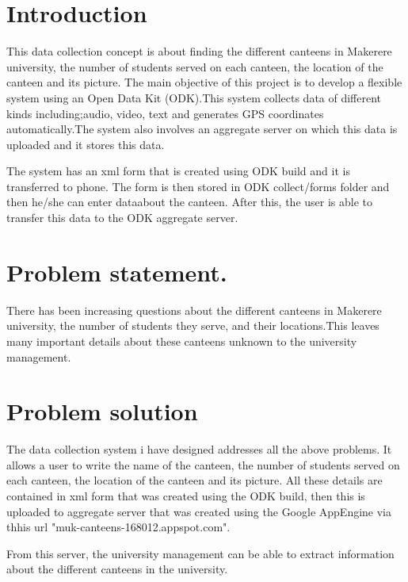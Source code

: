 \documentclass{article}
\begin{document}
\begin{large}\textbf{}\end{large}



\section{Introduction}
{This data collection concept is about finding the different canteens in Makerere university, the number of students served on each canteen, the location of the canteen and its picture.
The main objective of this project is to develop a flexible system using an Open Data Kit (ODK).This system collects data of different kinds including;audio, video, text and generates GPS coordinates automatically.The system also involves an aggregate server on which this data is uploaded and it stores this data.

The system has an xml form that is created using ODK build and it is transferred to phone. The form is then stored in ODK collect/forms folder and then he/she can enter dataabout the canteen. After this, the user is able to transfer this data to the ODK aggregate server.
}

\section{Problem statement.}
There has been increasing questions about the different canteens in Makerere university, the number of students they serve, and their locations.This leaves many important details about these canteens unknown to the university management.

\section{Problem solution}
The data collection system i have designed addresses all the above problems. It allows a user to write the name of the canteen,  the number of students served on each canteen, the location of the canteen and its picture. All these details are contained in xml form that was created using the ODK build, then this is uploaded to aggregate server that was created using the Google AppEngine via thhis url "muk-canteens-168012.appspot.com".

From this server, the university management can be able to extract information about the different canteens in the university.
\end{document}

